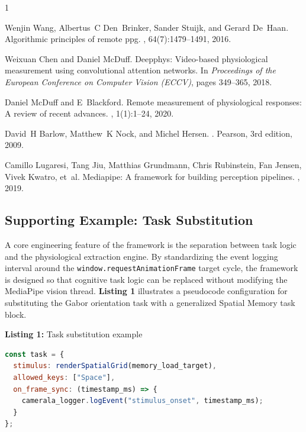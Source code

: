 \documentclass[dvipdfmx]{ehis}
\begin{document}
\begin{thebibliography}{1}

Wenjin Wang, Albertus~C Den~Brinker, Sander Stuijk, and Gerard De~Haan.
\newblock Algorithmic principles of remote ppg.
, 64(7):1479--1491,
  2016.

Weixuan Chen and Daniel McDuff.
\newblock Deepphys: Video-based physiological measurement using convolutional
  attention networks.
\newblock In {\em Proceedings of the European Conference on Computer Vision
  (ECCV)}, pages 349--365, 2018.

Daniel McDuff and E~Blackford.
\newblock Remote measurement of physiological responses: A review of recent
  advances.
, 1(1):1--24, 2020.

David~H Barlow, Matthew~K Nock, and Michel Hersen.
.
\newblock Pearson, 3rd edition, 2009.

Camillo Lugaresi, Tang Jiu, Matthias Grundmann, Chris Rubinstein, Fan Jensen,
  Vivek Kwatro, et~al.
\newblock Mediapipe: A framework for building perception pipelines.
, 2019.

\end{thebibliography}

\appendix{}
\subsection*{Supporting Example: Task Substitution}

A core engineering feature of the framework is the separation between task logic and the physiological extraction engine. By standardizing the event logging interval around the \texttt{window.requestAnimationFrame} target cycle, the framework is designed so that cognitive task logic can be replaced without modifying the MediaPipe vision thread. \textbf{Listing 1} illustrates a pseudocode configuration for substituting the Gabor orientation task with a generalized Spatial Memory task block.

\vspace{3mm}
\noindent\footnotesize{\textbf{Listing 1:} Task substitution example}
\vspace{-1mm}
\begin{lstlisting}[basicstyle=\ttfamily\scriptsize, frame=single, language=JavaScript]
const task = {
  stimulus: renderSpatialGrid(memory_load_target),
  allowed_keys: ["Space"],
  on_frame_sync: (timestamp_ms) => {
    camerala_logger.logEvent("stimulus_onset", timestamp_ms);
  }
};
\end{lstlisting}
\vspace{2mm}
\end{document}
